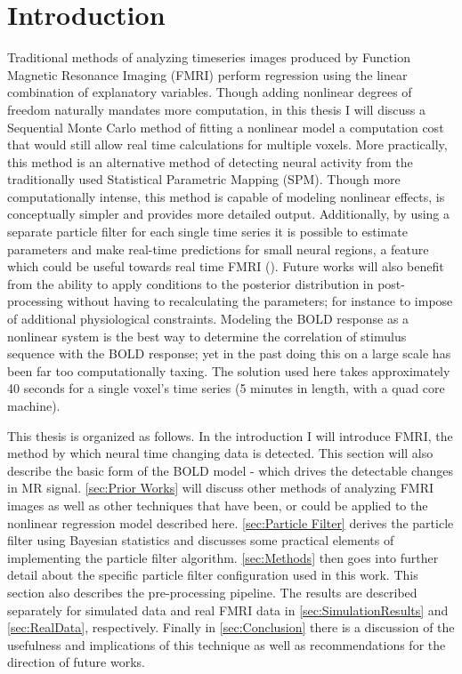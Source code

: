\chapter{Introduction}
Traditional methods of analyzing timeseries images produced by 
Function Magnetic Resonance 
Imaging (FMRI) perform regression using the linear combination of explanatory variables. 
Though adding nonlinear degrees of freedom naturally mandates more computation,
in this thesis I will discuss a Sequential Monte Carlo method of fitting a nonlinear
model a computation cost that would still allow real time calculations for multiple voxels.
More practically, this method is an alternative
method of detecting neural activity from the traditionally
used Statistical Parametric Mapping (SPM). Though more computationally intense,
this method is capable of modeling nonlinear effects, is conceptually simpler
and provides more detailed output. Additionally,
by using a separate particle filter for each single time series it 
is possible to estimate parameters and make real-time predictions
for small neural regions, a feature which could be useful towards real time FMRI 
(\cite{DeCharms2005}). Future works will also benefit from the ability to 
apply conditions to the posterior distribution in post-processing without
having to recalculating the parameters; for instance to impose of additional 
physiological
constraints. Modeling the BOLD response as a nonlinear system is the
best way to determine the correlation of stimulus sequence with the BOLD
response; yet in the past doing this on a large scale has been far too
computationally taxing. The solution used here takes approximately 40 seconds
for a single voxel's time series (5 minutes in length, with a quad core machine). 

This thesis is organized as follows. In the introduction I will introduce
FMRI, the method by which neural time changing data is detected. This section
will also describe the basic form of the BOLD model - which drives the 
detectable changes in MR signal. \autoref{sec:Prior Works} will discuss other
methods of analyzing FMRI images as well as other techniques that have
been, or could be applied to the nonlinear regression model described here. 
\autoref{sec:Particle Filter} derives the particle filter using Bayesian 
statistics and discusses some practical elements of implementing the 
particle filter algorithm. \autoref{sec:Methods} then goes into further
detail about the specific particle filter configuration used in this work.
This section also describes the pre-processing pipeline. 
The results are described separately for simulated data
and real FMRI data in \autoref{sec:SimulationResults} and \autoref{sec:RealData},
respectively. Finally in \autoref{sec:Conclusion} there is a discussion of
the usefulness and implications of this technique as well as recommendations
for the direction of future works. 

